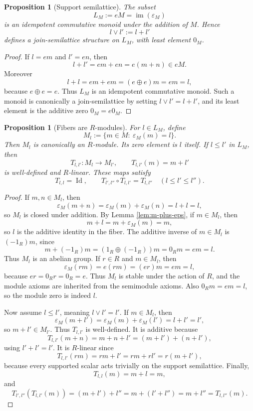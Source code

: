 \documentclass[11pt]{article}
\newcommand{\Id}{\operatorname{Id}}
\newcommand{\eps}{\varepsilon}
\theoremstyle{plain}
\newtheorem{proposition}[theorem]{Proposition}
\theoremstyle{definition}
\begin{document}
\begin{proposition}[Support semilattice]\label{prop:support-semilattice}
The subset
\[
   L_M:=eM=\operatorname{im}(\eps_M)
\]
is an idempotent commutative monoid under the addition of \(M\).  Hence
\[
   l\vee l':=l+l'
\]
defines a join-semilattice structure on \(L_M\), with least element \(0_M\).
\end{proposition}

\begin{proof}
If \(l=em\) and \(l'=en\), then
\[
   l+l'=em+en=e(m+n)\in eM.
\]
Moreover
\[
   l+l=em+em=(e\oplus e)m=em=l,
\]
because \(e\oplus e=e\).  Thus \(L_M\) is an idempotent commutative monoid.  Such a monoid is canonically a join-semilattice by setting \(l\vee l'=l+l'\), and its least element is the additive zero \(0_M=e0_M\).
\end{proof}

\begin{proposition}[Fibers are \(R\)-modules]\label{prop:fibers-modules}
For \(l\in L_M\), define
\[
   M_l:=\{m\in M:\ \eps_M(m)=l\}.
\]
Then \(M_l\) is canonically an \(R\)-module.  Its zero element is \(l\) itself.  If \(l\le l'\) in \(L_M\), then
\[
   T_{l,l'}:M_l\to M_{l'},
   \qquad
   T_{l,l'}(m)=m+l'
\]
is well-defined and \(R\)-linear.  These maps satisfy
\[
   T_{l,l}=\Id,
   \qquad
   T_{l',l''}\circ T_{l,l'}=T_{l,l''}
   \quad(l\le l'\le l'').
\]
\end{proposition}

\begin{proof}
If \(m,n\in M_l\), then
\[
   \eps_M(m+n)=\eps_M(m)+\eps_M(n)=l+l=l,
\]
so \(M_l\) is closed under addition.  By Lemma \ref{lem:m-plus-eps}, if \(m\in M_l\), then
\[
   m+l=m+\eps_M(m)=m,
\]
so \(l\) is the additive identity in the fiber.  The additive inverse of \(m\in M_l\) is \((-1_R)m\), since
\[
   m+(-1_R)m=(1_R\oplus(-1_R))m=0_Rm=em=l.
\]
Thus \(M_l\) is an abelian group.  If \(r\in R\) and \(m\in M_l\), then
\[
   \eps_M(rm)=e(rm)=(er)m=em=l,
\]
because \(er=0_Rr=0_R=e\).  Thus \(M_l\) is stable under the action of \(R\), and the module axioms are inherited from the semimodule axioms.  Also \(0_Rm=em=l\), so the module zero is indeed \(l\).

Now assume \(l\le l'\), meaning \(l\vee l'=l'\).  If \(m\in M_l\), then
\[
   \eps_M(m+l')=\eps_M(m)+\eps_M(l')=l+l'=l',
\]
so \(m+l'\in M_{l'}\).  Thus \(T_{l,l'}\) is well-defined.  It is additive because
\[
   T_{l,l'}(m+n)=m+n+l'=(m+l')+(n+l'),
\]
using \(l'+l'=l'\).  It is \(R\)-linear since
\[
   T_{l,l'}(rm)=rm+l'=rm+rl'=r(m+l'),
\]
because every supported scalar acts trivially on the support semilattice.  Finally,
\[
   T_{l,l}(m)=m+l=m,
\]
and
\[
   T_{l',l''}(T_{l,l'}(m))=(m+l')+l''=m+(l'+l'')=m+l''=T_{l,l''}(m).
\]
\end{proof}
\end{document}
